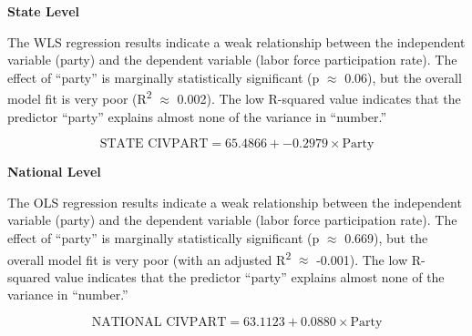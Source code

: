 \textbf{State Level}

The WLS regression results indicate a  weak relationship between the independent variable (party) and the dependent variable (labor force participation rate). The effect of ``party'' is marginally statistically significant (p $\approx$ 0.06), but the overall model fit is very poor (R\textsuperscript{2} $\approx$ 0.002). The low R-squared value indicates that the predictor ``party'' explains almost none of the variance in ``number.''

\begin{equation}
\text{STATE CIVPART} = 65.4866 + -0.2979 \times \text{Party}
\end{equation}

\textbf{National Level}

The OLS regression results indicate a  weak relationship between the independent variable (party) and the dependent variable (labor force participation rate). The effect of ``party'' is marginally statistically significant (p $\approx$ 0.669), but the overall model fit is very poor (with an adjusted R\textsuperscript{2} $\approx$ -0.001). The low R-squared value indicates that the predictor ``party'' explains almost none of the variance in ``number.''

\begin{equation}
\text{NATIONAL CIVPART} = 63.1123 + 0.0880 \times \text{Party}
\end{equation}